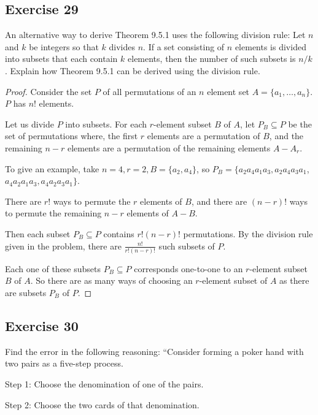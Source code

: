 \documentclass[14pt]{extarticle}
\newcommand{\dps}{\displaystyle}
\newcommand{\cy}{\color{cyan}}
\begin{document}
\subsection{Exercise 29}
An alternative way to derive Theorem 9.5.1 uses the following division rule: Let \(n\) and \(k\) be integers so that \(k\) 
divides \(n\). If a set consisting of \(n\) elements is divided into subsets that each contain \(k\) elements, then 
the number of such subsets is \(n/k\). Explain how Theorem 9.5.1 can be derived using the division rule.

\begin{proof}
Consider the set \(P\) of all permutations of an \(n\) element set \(A = \{a_1, \ldots, a_n\}\). \(P\) has \(n!\) elements.

Let us divide \(P\) into subsets. For each \(r\)-element subset \(B\) of \(A\), let \(P_B \subseteq P\) be the set of 
permutations where, the first \(r\) elements are a permutation of \(B\), and the remaining \(n-r\) elements are a permutation 
of the remaining elements \(A - A_r\).

To give an example, take \(n = 4, r = 2, B = \{a_2, a_4\}\), so \(P_B = \{a_2a_4a_1a_3, a_2a_4a_3a_1\), \\ \(a_4a_2a_1a_3, 
a_4a_2a_3a_1\}\).

There are \(r!\) ways to permute the \(r\) elements of \(B\), and there are \((n-r)!\) ways to permute the remaining 
\(n-r\) elements of \(A - B\).

Then each subset \(P_B \subseteq P\) contains \(r!(n-r)!\) permutations. By the division rule given in the problem, there 
are \(\dps \frac{n!}{r!(n-r)!}\) such subsets of \(P\).

Each one of these subsets \(P_B \subseteq P\) corresponds one-to-one to an \(r\)-element subset \(B\) of \(A\). So there are 
as many ways of choosing an \(r\)-element subset of \(A\) as there are subsets \(P_B\) of \(P\).
\end{proof}

\subsection{Exercise 30}
Find the error in the following reasoning: “Consider forming a poker hand with two pairs as a five-step process.

{\cy Step 1:} Choose the denomination of one of the pairs.

{\cy Step 2:} Choose the two cards of that denomination.
\end{document}
